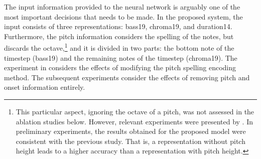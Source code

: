 
The input information provided to the neural network is
arguably one of the most important decisions that needs to
be made. In the proposed system, the input consists of three
representations: \gls{bass19}, \gls{chroma19}, and
\gls{duration14}. Furthermore, the pitch information
considers the spelling of the notes, but discards the
octave,\footnote{This particular aspect, ignoring the octave
of a pitch, was not assessed in the ablation studies below.
However, relevant experiments were presented by
\textcite{micchi2020not}. In preliminary experiments, the
results obtained for the proposed model were consistent with
the previous study. That is, a representation without pitch
height leads to a higher accuracy than a representation with
pitch height.} and it is divided in two parts: the bottom
note of the timestep (\gls{bass19}) and the remaining notes
of the timestep (\gls{chroma19}). The experiment in
considers the effects of modifying the pitch spelling
encoding method. The subsequent experiments consider the
effects of removing pitch and onset information entirely.
